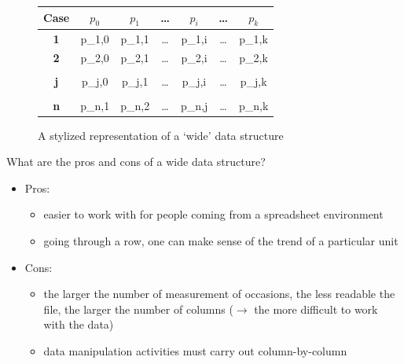 \documentclass[a4paper,11pt]{book}
\newcommand{\question}[1]{%
    \begin{tcolorbox}[colback=comp_c!10,colframe=comp_c,sidebyside align=top,width=\linewidth,before skip=1ex]
        #1
    \end{tcolorbox}
    \switchcolumn%
}
\newcommand{\note}[1]{%
    \begin{tcolorbox}[colback=white!0,colframe=white!10,width=\linewidth,before skip=1ex]
        #1
    \end{tcolorbox}
}
\begin{document}
\begin{figure}[!htbp]
	\centering
	\begin{tabular}{|c|c|c|c|c|c|c|}
		\hline
		\textbf{Case} & \textbf{$p_{0}$} & \textbf{$p_{1}$} & \ldots & \textbf{$p_{i}$} & \ldots & \textbf{$p_{k}$} \\ \hline
		\textbf{1}    & p_{1,0} & p_{1,1} & \ldots & p_{1,i} & \ldots & p_{1,k} \\
		\textbf{2}    & p_{2,0} & p_{2,1} & \ldots & p_{2,i} & \ldots & p_{2,k} \\
                \multicolumn{7}{c}{}\\
		\textbf{j}    & p_{j,0} & p_{j,1} & \ldots & p_{j,i} & \ldots & p_{j,k} \\
                \multicolumn{7}{c}{}\\
		\textbf{n}    & p_{n,1} & p_{n,2} & \ldots & p_{n,j} & \ldots & p_{n,k} \\
		\hline 
	\end{tabular}
	\caption{A stylized representation of a `wide' data structure}
	\label{fig:wide_dataframe}
\end{figure}

\begin{paracol}{2}
	\question{
		\raggedright What are the pros and cons of a wide data structure?
	}
	\note{
		\begin{itemize}
			\item Pros:
			\begin{itemize}
				\item easier to work with for people coming from a spreadsheet environment
				\item going through a row, one can make sense of the trend of a particular unit
			\end{itemize}
			\item Cons:
			\begin{itemize}
				\item the larger the number of measurement of occasions, the less readable the file, the larger the number of columns ($\rightarrow$ the more difficult to work with the data)
				\item data manipulation activities must carry out column-by-column
			\end{itemize}
		\end{itemize}
		}
\end{paracol}
\clearpage
\end{document}
